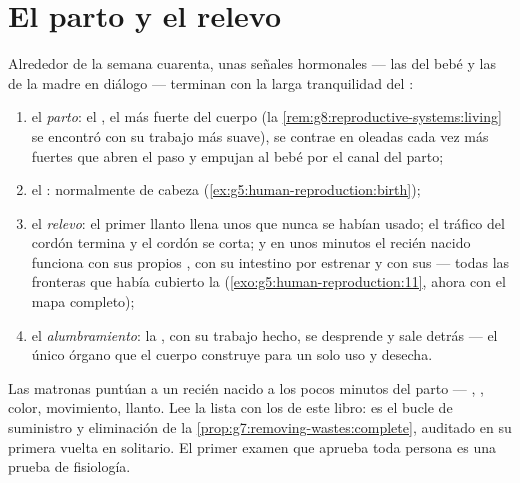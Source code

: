 \section{El parto y el relevo}

\begin{proposition}\label{prop:g8:from-egg-to-birth:birth}
Alrededor de la semana cuarenta, unas señales hormonales --- las del
bebé y las de la madre en diálogo --- terminan con la larga tranquilidad
del :
\begin{enumerate}
  \item el \emph{parto}: el , el  más fuerte del cuerpo (la
        \cref{rem:g8:reproductive-systems:living} se encontró con su
        trabajo más suave), se contrae en oleadas cada vez más fuertes
        que abren el paso y empujan al bebé por el canal del parto;
  \item el \emph{}: normalmente de cabeza
        (\cref{ex:g5:human-reproduction:birth});
  \item el \emph{relevo}: el primer llanto llena unos  que
        nunca se habían usado; el tráfico del cordón termina y el
        cordón se corta; y en unos minutos el recién nacido funciona
        con sus propios , con su intestino por estrenar y con
        sus  --- todas las fronteras que había cubierto la
         (\cref{exo:g5:human-reproduction:11}, ahora con el
        mapa completo);
  \item el \emph{alumbramiento}: la , con su trabajo hecho, se
        desprende y sale detrás --- el único órgano que el cuerpo
        construye para un solo uso y desecha.
\end{enumerate}
\end{proposition}
\admitted

\begin{example}\label{ex:g8:from-egg-to-birth:audit}
Las matronas puntúan a un recién nacido a los pocos minutos del parto
--- , , color, movimiento, llanto. Lee la lista con
los  de este libro: es el bucle de suministro y eliminación de la
\cref{prop:g7:removing-wastes:complete}, auditado en su primera vuelta
en solitario. El primer examen que aprueba toda persona es una prueba
de fisiología.
\end{example}

